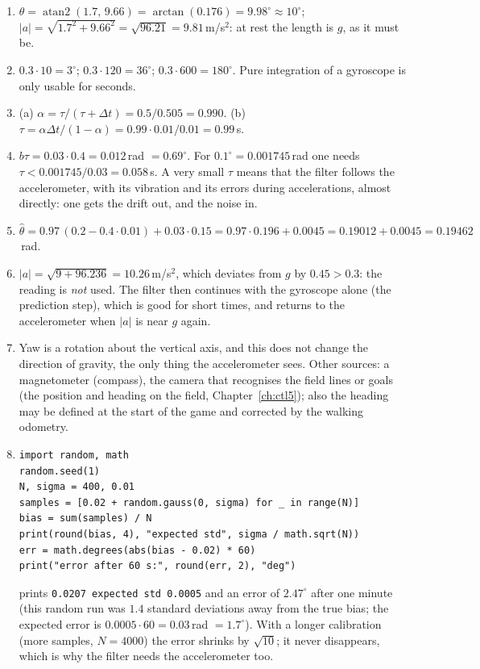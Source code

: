 \begin{enumerate}[label=\textbf{\ansnum.\arabic*}]
  \item $\theta=\operatorname{atan2}(1.7,\,9.66)=\arctan(0.176)=9.98^{\circ}\approx10^{\circ}$; $|a|=\sqrt{1.7^2+9.66^2}=\sqrt{96.21}=9.81$\,m/s$^2$: at rest the length is $g$, as it must be.
  \item $0.3\cdot10=3^{\circ}$; $0.3\cdot120=36^{\circ}$; $0.3\cdot600=180^{\circ}$. Pure integration of a gyroscope is only usable for seconds.
  \item (a) $\alpha=\tau/(\tau+\Delta t)=0.5/0.505=0.990$. (b) $\tau=\alpha\Delta t/(1-\alpha)=0.99\cdot0.01/0.01=0.99$\,s.
  \item $b\tau=0.03\cdot0.4=0.012$\,rad $=0.69^{\circ}$. For $0.1^{\circ}=0.001745$\,rad one needs $\tau<0.001745/0.03=0.058$\,s. A very small $\tau$ means that the filter follows the accelerometer, with its vibration and its errors during accelerations, almost directly: one gets the drift out, and the noise in.
  \item $\hat\theta=0.97\,(0.2-0.4\cdot0.01)+0.03\cdot0.15=0.97\cdot0.196+0.0045=0.19012+0.0045=0.19462$\,rad.
  \item $|a|=\sqrt{9+96.236}=10.26$\,m/s$^2$, which deviates from $g$ by $0.45>0.3$: the reading is \emph{not} used. The filter then continues with the gyroscope alone (the prediction step), which is good for short times, and returns to the accelerometer when $|a|$ is near $g$ again.
  \item Yaw is a rotation about the vertical axis, and this does not change the direction of gravity, the only thing the accelerometer sees. Other sources: a magnetometer (compass), the camera that recognises the field lines or goals (the position and heading on the field, Chapter~\ref{ch:ctl5}); also the heading may be defined at the start of the game and corrected by the walking odometry.
  \item
\begin{verbatim}
import random, math
random.seed(1)
N, sigma = 400, 0.01
samples = [0.02 + random.gauss(0, sigma) for _ in range(N)]
bias = sum(samples) / N
print(round(bias, 4), "expected std", sigma / math.sqrt(N))
err = math.degrees(abs(bias - 0.02) * 60)
print("error after 60 s:", round(err, 2), "deg")
\end{verbatim}
prints \verb!0.0207 expected std 0.0005! and an error of $2.47^{\circ}$ after one minute (this random run was $1.4$ standard deviations away from the true bias; the expected error is $0.0005\cdot60=0.03$\,rad $=1.7^{\circ}$). With a longer calibration (more samples, $N=4000$) the error shrinks by $\sqrt{10}$; it never disappears, which is why the filter needs the accelerometer too.

\end{enumerate}

